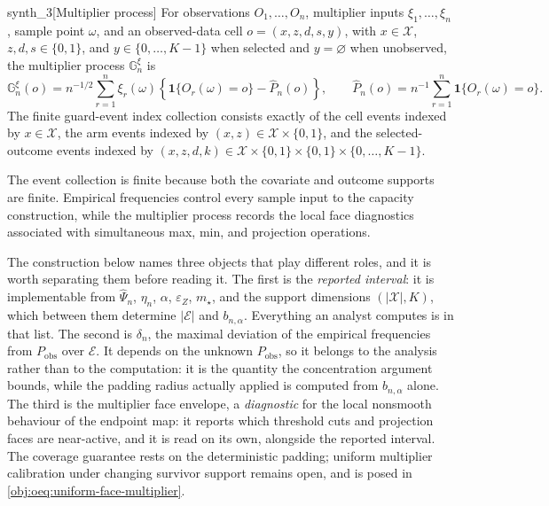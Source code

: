 \documentclass[11pt]{article}
\begin{document}
\begin{definitionv}{synth_3}[Multiplier process]
For observations \(O_1,\ldots,O_n\), multiplier inputs \(\xi_1,\ldots,\xi_n\), sample point \(\omega\), and an observed-data cell \(o=(x,z,d,s,y)\), with \(x\in\mathcal X\), \(z,d,s\in\{0,1\}\), and \(y\in\{0,\ldots,K-1\}\) when selected and \(y=\varnothing\) when unobserved, the multiplier process \(\mathbb G_n^\xi\) is
\[
\mathbb G_n^\xi(o)
=
n^{-1/2}
\sum_{r=1}^n
\xi_r(\omega)
\left\{
\mathbf 1\{O_r(\omega)=o\}
-
\widehat P_n(o)
\right\},
\qquad
\widehat P_n(o)
=
n^{-1}\sum_{r=1}^n \mathbf 1\{O_r(\omega)=o\}.
\]
The finite guard-event index collection consists exactly of the cell events indexed by \(x\in\mathcal X\), the arm events indexed by \((x,z)\in\mathcal X\times\{0,1\}\), and the selected-outcome events indexed by \((x,z,d,k)\in\mathcal X\times\{0,1\}\times\{0,1\}\times\{0,\ldots,K-1\}\).
\end{definitionv}

The event collection  is finite because both the covariate and outcome supports are finite.  Empirical frequencies  control every sample input to the capacity construction, while the multiplier process  records the local face diagnostics associated with simultaneous max, min, and projection operations.

The construction below names three objects that play different roles, and it is worth separating them before reading it.  The first is the \emph{reported interval}: it is implementable from \(\widehat\Psi_n\), \(\eta_n\), \(\alpha\), \(\varepsilon_Z\), \(m_\star\), and the support dimensions \((|\mathcal X|,K)\), which between them determine \(|\mathcal E|\) and \(b_{n,\alpha}\).  Everything an analyst computes is in that list.  The second is \(\delta_n\), the maximal deviation of the empirical frequencies from \(P_{\mathrm{obs}}\) over \(\mathcal E\).  It depends on the unknown \(P_{\mathrm{obs}}\), so it belongs to the analysis rather than to the computation: it is the quantity the concentration argument bounds, while the padding radius actually applied is computed from \(b_{n,\alpha}\) alone.  The third is the multiplier face envelope, a \emph{diagnostic} for the local nonsmooth behaviour of the endpoint map: it reports which threshold cuts and projection faces are near-active, and it is read on its own, alongside the reported interval.  The coverage guarantee rests on the deterministic padding; uniform multiplier calibration under changing survivor support remains open, and is posed in \cref{obj:oeq:uniform-face-multiplier}.
\end{document}
